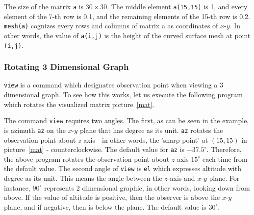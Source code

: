\begin{center}
\end{center}
\vn The size of the matrix {\tt a} is $30 \times 30$. The middle element {\tt a(15,15)} is 1, and every element of the 7-th row is 0.1, and the remaining elements of the 15-th row is 0.2. {\tt mesh(a)} cognizes every rows and columns of matrix a as coordinates of $x$-$y$. In other words, the value of {\tt a(i,j)} is the height of the curved surface mesh at point {\tt (i,j)}.

\subsubsection{Rotating 3 Dimensional Graph}
{\tt view} is a command which designates observation point when viewing a 3 dimensional graph. To see how this works, let us execute the following program which rotates the visualized matrix picture~\ref{mat}.

\begin{center}
\end{center}
\vn The command {\tt view} requires two angles. The first, as can be seen in the example, is azimuth {\tt az} on the $x$-$y$ plane that has degree as its unit. {\tt az} rotates the observation point about $z$-axis - in other words, the 'sharp point' at $(15,15)$ in picture~\ref{mat} - counterclockwise. The default value for {\tt az} is $-37.5^{\circ}$. Therefore, the above program rotates the observation point about $z$-axis $15^{\circ}$ each time from the default value. The second angle of {\tt view} is {\tt el} which expresses altitude with degree as its unit. This means the angle between the $z$-axis and $x$-$y$ plane. For instance, $90^{\circ}$ represents 2 dimensional graphic, in other words, looking down from above. If the value of altitude is positive, then the observer is above the $x$-$y$ plane, and if negative, then is below the plane. The default value is $30^{\circ}$.

